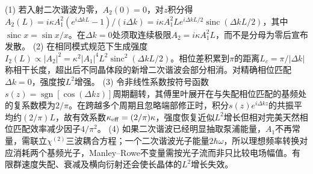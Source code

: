 (1) 若入射二次谐波为零，\(A_2(0)=0\)，对\(z\)积分得\(A_2(L)=i\kappa A_1^2(e^{i\Delta kL}-1)/(i\Delta k)=i\kappa A_1^2 L e^{i\Delta k L/2}\operatorname{sinc}(\Delta k L/2)\)，其中\(\operatorname{sinc}x=\sin x/x\)。在\(\Delta k=0\)处须取连续极限\(A_2=i\kappa A_1^2 L\)，而不是分母为零后宣布发散。
(2) 在相同模式规范下生成强度\(I_2(L)\propto|A_2|^2=\kappa^2|A_1|^4L^2\operatorname{sinc}^2(\Delta kL/2)\)。相位差积累到\(\pi\)的距离\(L_c=\pi/|\Delta k|\)称相干长度，超出后不同晶体段的新增二次谐波会部分相消。对精确相位匹配\(\Delta k=0\)，强度按\(L^2\)增强。
(3) 令非线性系数按符号函数\(s(z)=\operatorname{sgn}[\cos(\Delta k z)]\)周期翻转，其傅里叶展开在与失配相位匹配的基频处的复系数模为\(2/\pi\)。在跨越多个周期且忽略端部修正时，积分\(s(z)e^{i\Delta kz}\)的共振平均约\((2/\pi)L\)，故有效系数\(\kappa_{\rm eff}=(2/\pi)\kappa\)，强度恢复近似\(L^2\)增长但相对完美天然相位匹配效率减少因子\(4/\pi^2\)。
(4) 如果二次谐波已经明显抽取泵浦能量，\(A_1\)不再常量，需联立\(\chi^{(2)}\)三波耦合方程；一个二次谐波光子能量\(2\hbar\omega\)，所以理想频率转换对应消耗两个基频光子，Manley–Rowe不变量需按光子流而非只比较电场幅值。有限群速度失配、衰减及横向衍射还会使长晶体的\(L^2\)增长失效。
